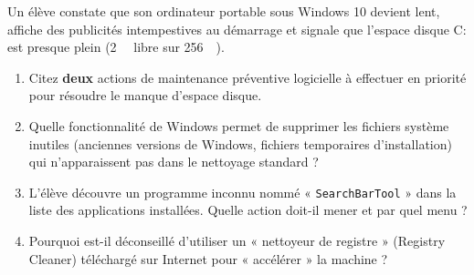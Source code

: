 \documentclass[11pt]{article}
\begin{document}
\begin{exercice}
Un élève constate que son ordinateur portable sous Windows 10 devient lent, affiche des publicités intempestives au démarrage et signale que l'espace disque C: est presque plein (\SI{2}{\giga\byte} libre sur \SI{256}{\giga\byte}).
\begin{enumerate}
    \item Citez \textbf{deux} actions de maintenance préventive logicielle à effectuer en priorité pour résoudre le manque d'espace disque.
    \item Quelle fonctionnalité de Windows permet de supprimer les fichiers système inutiles (anciennes versions de Windows, fichiers temporaires d'installation) qui n'apparaissent pas dans le nettoyage standard ?
    \item L'élève découvre un programme inconnu nommé « \texttt{SearchBarTool} » dans la liste des applications installées. Quelle action doit-il mener et par quel menu ?
    \item Pourquoi est-il déconseillé d'utiliser un « nettoyeur de registre » (Registry Cleaner) téléchargé sur Internet pour « accélérer » la machine ?
\end{enumerate}
\end{exercice}
\end{document}
